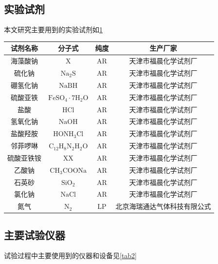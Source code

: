 

\subsection{实验试剂}

本文研究主要用到的实验试剂如\cref{tab1}

\begin{table}[h]
	\centering
	\label{tab1}
	\begin{tabular}{@{}cccc@{}}
        \toprule
		试剂名称&分子式&纯度&生产厂家\\
        \midrule
		海藻酸钠&X&AR&天津市福晨化学试剂厂\\
		硫化钠&$\mathrm{Na_2S}$&AR&天津市福晨化学试剂厂\\
		硼氢化钠&$\mathrm{NaBH}$&AR&天津市福晨化学试剂厂\\
		硫酸亚铁&$\mathrm{FeSO_4\cdot7H_2O}$&AR&天津市福晨化学试剂厂\\
		盐酸&$\mathrm{HCl}$&AR&天津市福晨化学试剂厂\\
        氢氧化钠&$\mathrm{NaOH}$&AR&天津市福晨化学试剂厂\\
        盐酸羟胺&$\mathrm{HONH_3Cl}$&AR&天津市福晨化学试剂厂\\
        邻菲啰啉&$\mathrm{C_12H_8N_2H_2O}$&AR&天津市福晨化学试剂厂\\
        硫酸亚铁铵&XX&AR&天津市福晨化学试剂厂\\
        乙酸钠&$\mathrm{CH_3COONa}$&AR&天津市福晨化学试剂厂\\
        石英砂&$\mathrm{SiO_2}$&AR&天津市福晨化学试剂厂\\
        氯化钠&$\mathrm{NaCl}$&AR&天津市福晨化学试剂厂\\
        氮气&$\mathrm{N_2}$&LP&北京海瑞通达气体科技有限公式\\
        \bottomrule
	\end{tabular}
\end{table}

\subsection{主要试验仪器}

试验过程中主要使用到的仪器和设备见\cref{tab2}

